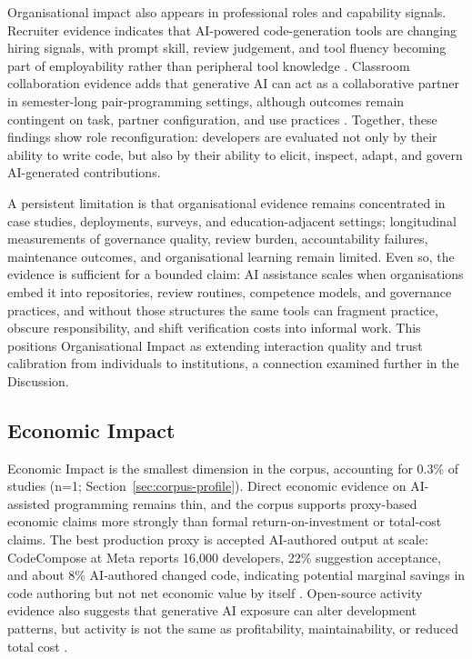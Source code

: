 Organisational impact also appears in professional roles and capability signals. Recruiter evidence indicates that AI-powered code-generation tools are changing hiring signals, with prompt skill, review judgement, and tool fluency becoming part of employability rather than peripheral tool knowledge \cite{chen_impact_2025}. Classroom collaboration evidence adds that generative AI can act as a collaborative partner in semester-long pair-programming settings, although outcomes remain contingent on task, partner configuration, and use practices \cite{lyu_will_2025}. Together, these findings show role reconfiguration: developers are evaluated not only by their ability to write code, but also by their ability to elicit, inspect, adapt, and govern AI-generated contributions.

A persistent limitation is that organisational evidence remains concentrated in case studies, deployments, surveys, and education-adjacent settings; longitudinal measurements of governance quality, review burden, accountability failures, maintenance outcomes, and organisational learning remain limited. Even so, the evidence is sufficient for a bounded claim: AI assistance scales when organisations embed it into repositories, review routines, competence models, and governance practices, and without those structures the same tools can fragment practice, obscure responsibility, and shift verification costs into informal work. This positions Organisational Impact as extending interaction quality and trust calibration from individuals to institutions, a connection examined further in the Discussion.

\subsection{Economic Impact}
\label{sec:economic}
Economic Impact is the smallest dimension in the corpus, accounting for 0.3\% of studies (n=1; Section~\ref{sec:corpus-profile}). Direct economic evidence on AI-assisted programming remains thin, and the corpus supports proxy-based economic claims more strongly than formal return-on-investment or total-cost claims. The best production proxy is accepted AI-authored output at scale: CodeCompose at Meta reports 16,000 developers, 22\% suggestion acceptance, and about 8\% AI-authored changed code, indicating potential marginal savings in code authoring but not net economic value by itself \cite{murali_ai-assisted_2024}. Open-source activity evidence also suggests that generative AI exposure can alter development patterns, but activity is not the same as profitability, maintainability, or reduced total cost \cite{li_exploring_2025}.

